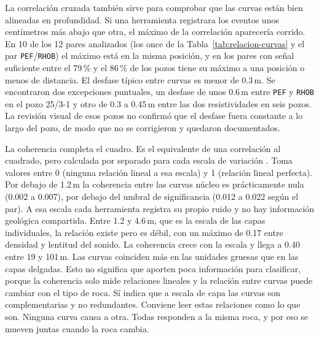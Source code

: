 \documentclass[11pt,a4paper]{article}
\begin{document}
La correlación cruzada también sirve para comprobar que las curvas están bien alineadas en profundidad. Si una herramienta registrara los eventos unos centímetros más abajo que otra, el máximo de la correlación aparecería corrido. En 10 de los 12 pares analizados (los once de la Tabla~\ref{tab:relacion-curvas} y el par \texttt{PEF}/\texttt{RHOB}) el máximo está en la misma posición, y en los pares con señal suficiente entre el 79\,\% y el 86\,\% de los pozos tiene su máximo a una posición o menos de distancia. El desfase típico entre curvas es menor de 0.3\,m. Se encontraron dos excepciones puntuales, un desfase de unos 0.6\,m entre \texttt{PEF} y \texttt{RHOB} en el pozo 25/3-1 y otro de 0.3 a 0.45\,m entre las dos resistividades en seis pozos. La revisión visual de esos pozos no confirmó que el desfase fuera constante a lo largo del pozo, de modo que no se corrigieron y quedaron documentados.

La coherencia completa el cuadro. Es el equivalente de una correlación al cuadrado, pero calculada por separado para cada escala de variación \cite[Sec.~4.6]{shumway2011}. Toma valores entre 0 (ninguna relación lineal a esa escala) y 1 (relación lineal perfecta). Por debajo de 1.2\,m la coherencia entre las curvas núcleo es prácticamente nula (0.002 a 0.007), por debajo del umbral de significancia (0.012 a 0.022 según el par). A esa escala cada herramienta registra su propio ruido y no hay información geológica compartida. Entre 1.2 y 4.6\,m, que es la escala de las capas individuales, la relación existe pero es débil, con un máximo de 0.17 entre densidad y lentitud del sonido. La coherencia crece con la escala y llega a 0.40 entre 19 y 101\,m. Las curvas coinciden más en las unidades gruesas que en las capas delgadas. Esto no significa que aporten poca información para clasificar, porque la coherencia solo mide relaciones lineales y la relación entre curvas puede cambiar con el tipo de roca. Sí indica que a escala de capa las curvas son complementarias y no redundantes. Conviene leer estas relaciones como lo que son. Ninguna curva causa a otra. Todas responden a la misma roca, y por eso se mueven juntas cuando la roca cambia.
\end{document}
